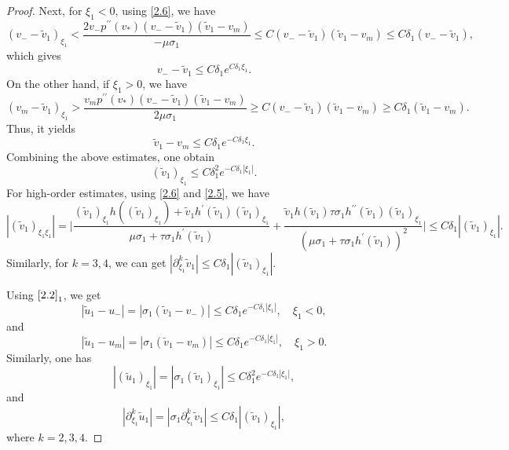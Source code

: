 \documentclass[10pt,reqno]{amsart}
\numberwithin{equation}{section}
\begin{document}
\begin{proof}
Next, for $\xi_1<0$, using \eqref{2.6}, we have
\[
(v_--\widetilde{v}_1)_{\xi_1}<\frac{2v_-p^{\prime\prime}(v_\ast)(v_--\widetilde{v}_1)(\widetilde{v}_1-v_m)}{-\mu\sigma_1}
\le C(v_--\widetilde{v}_1)(\widetilde{v}_1-v_m)\le C\delta_1(v_--\widetilde{v}_1),
\]
which gives
\[
v_--\widetilde{v}_1 \le C\delta_1e^{C\delta_1\xi_1}.
\]
On the other hand, if $\xi_1>0$, we have
\[
(v_m-\widetilde{v}_1)_{\xi_1}>\frac{v_mp^{\prime\prime}(v_\ast)(v_--\widetilde{v}_1)(\widetilde{v}_1-v_m)}{2\mu\sigma_1}
\ge C(v_--\widetilde{v}_1)(\widetilde{v}_1-v_m)\ge C\delta_1(\widetilde{v}_1-v_m).
\]
Thus, it yields
\[
\widetilde{v}_1-v_m \le C\delta_1e^{-C\delta_1\xi_1}.
\]
Combining the above estimates, one obtain
\[
(\widetilde{v}_1)_{\xi_1}\le C\delta_1^2e^{-C\delta_1|\xi_1|}.
\]
For high-order estimates, using \eqref{2.6} and \eqref{2.5}, we have
\[
|(\widetilde{v}_1)_{\xi_1\xi_1}|=\Big|
\frac{(\widetilde{v}_1)_{\xi_1}h((\widetilde{v}_1)_{\xi_1})
+\widetilde{v}_1h^{\prime}(\widetilde{v}_1)(\widetilde{v}_1)_{\xi_1}}
{\mu\sigma_1+\tau\sigma_1 h^{\prime}(\widetilde{v}_1)}
+\frac{\widetilde{v}_1 h(\widetilde{v}_1)\tau\sigma_1 h^{\prime\prime}(\widetilde{v}_1)(\widetilde{v}_1)_{\xi_1}}
{\left(\mu\sigma_1+\tau\sigma_1 h^{\prime}(\widetilde{v}_1)\right)^2}\Big|
\le C\delta_1|(\widetilde{v}_1)_{\xi_1}|.
\]
Similarly, for $k=3,4$, we can get $|\partial_{\xi_1}^k\widetilde{v}_1|\le C\delta_1|(\widetilde{v}_1)_{\xi_1}|$.

Using $\eqref{2.2}_1$, we get
\[
|\widetilde{u}_1-u_-|=|\sigma_1(\widetilde{v}_1-v_-)|\leq C\delta_1 e^{-C\delta_1|\xi_1|},\quad \xi_1<0,
\]
and
\[
|\widetilde{u}_1-u_m|=|\sigma_1(\widetilde{v}_1-v_m)|\leq C\delta_1 e^{-C\delta_1|\xi_1|},\quad \xi_1>0.
\]
Similarly,  one has
\[
|(\widetilde{u}_1)_{\xi_1}|=|\sigma_1(\widetilde{v}_1)_{\xi_1}|\le C\delta_1^2e^{-C\delta_1|\xi_1|},
\]
and
\[
|\partial_{\xi_1}^k\widetilde{u}_1|=|\sigma_1\partial_{\xi_1}^k\widetilde{v}_1|
\le C\delta_1|(\widetilde{v}_1)_{\xi_1}|,
\]
where $k=2,3,4$.


\end{proof}
\end{document}
